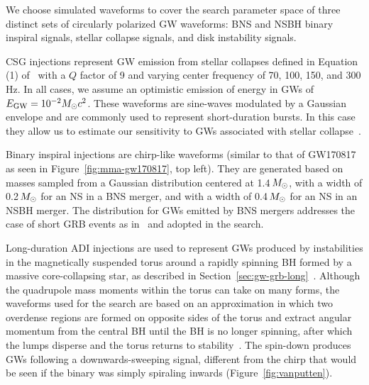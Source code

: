 We choose simulated waveforms to cover the search parameter space of three distinct sets of circularly polarized \ac{GW} waveforms: \ac{BNS} and \ac{NSBH} binary inspiral signals, stellar collapse signals, and disk instability signals.

\Ac{CSG} injections represent GW emission from stellar collapses defined in Equation (1) of~\citet{grb_o1} with a $Q$ factor of 9 and varying center frequency of 70, 100, 150, and 300\,Hz.
In all cases, we assume an optimistic emission of energy in \acp{GW} of $E_{\text{GW}} = 10^{-2} M_{\odot} c^2$.
These waveforms are sine-waves modulated by a Gaussian envelope and are commonly used to represent short-duration bursts.
In this case they allow us to estimate our sensitivity to GWs associated with stellar collapse~\citep{Fryer_2011, Fryer_2002}.

Binary inspiral injections are chirp-like waveforms (similar to that of GW170817 as seen in Figure~\ref{fig:mma-gw170817}, top left).
They are generated based on masses sampled from a Gaussian distribution centered at 1.4\,$M_{\odot}$, with a width of 0.2\,$M_{\odot}$ for an \ac{NS} in a \ac{BNS} merger, and with a width of 0.4\,$M_{\odot}$ for an \ac{NS} in an \ac{NSBH} merger.
The distribution for \acp{GW} emitted by \ac{BNS} mergers addresses the case of short \ac{GRB} events as in~\citet{grb_o1} and adopted in the \pygrb search.

Long-duration \ac{ADI} injections are used to represent \acp{GW} produced by instabilities in the magnetically suspended torus around a rapidly spinning \ac{BH} formed by a massive core-collapsing star, as described in Section~\ref{sec:gw-grb-long}~\citep{vanPutten_2001, vanPutten_2004}.
Although the quadrupole mass moments within the torus can take on many forms, the waveforms used for the \xpip search are based on an approximation in which two overdense regions are formed on opposite sides of the torus and extract angular momentum from the central BH until the BH is no longer spinning, after which the lumps disperse and the torus returns to stability~\citep{Santamaria_2013}.
The spin-down produces GWs following a downwards-sweeping signal, different from the chirp that would be seen if the binary was simply spiraling inwards (Figure~\ref{fig:vanputten}).

